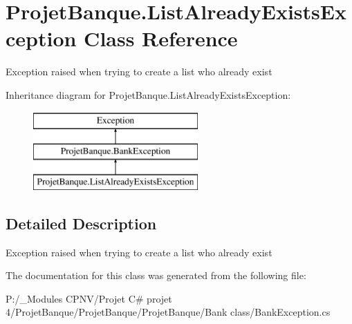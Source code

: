 \hypertarget{class_projet_banque_1_1_list_already_exists_exception}{}\section{Projet\+Banque.\+List\+Already\+Exists\+Exception Class Reference}
\label{class_projet_banque_1_1_list_already_exists_exception}


Exception raised when trying to create a list who already exist  


Inheritance diagram for Projet\+Banque.\+List\+Already\+Exists\+Exception\+:\begin{figure}[H]
\begin{center}
\leavevmode
\includegraphics[height=3.000000cm]{class_projet_banque_1_1_list_already_exists_exception}
\end{center}
\end{figure}


\subsection{Detailed Description}
Exception raised when trying to create a list who already exist 



The documentation for this class was generated from the following file\+:\begin{DoxyCompactItemize}
\item 
P\+:/\+\_\+\+Modules C\+P\+N\+V/\+Projet C\# projet 4/\+Projet\+Banque/\+Projet\+Banque/\+Projet\+Banque/\+Bank class/Bank\+Exception.\+cs\end{DoxyCompactItemize}
